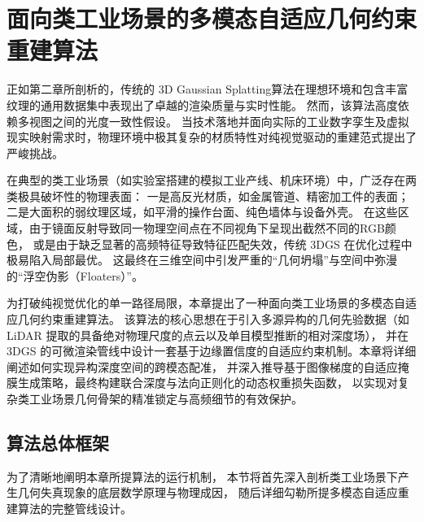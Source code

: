 
\chapter{面向类工业场景的多模态自适应几何约束重建算法}
\label{chap:method1}

正如第二章所剖析的，传统的 3D Gaussian Splatting算法在理想环境和包含丰富纹理的通用数据集中表现出了卓越的渲染质量与实时性能。
然而，该算法高度依赖多视图之间的光度一致性假设。
当技术落地并面向实际的工业数字孪生及虚拟现实映射需求时，物理环境中极其复杂的材质特性对纯视觉驱动的重建范式提出了严峻挑战。

在典型的类工业场景（如实验室搭建的模拟工业产线、机床环境）中，广泛存在两类极具破坏性的物理表面：
一是高反光材质，如金属管道、精密加工件的表面；
二是大面积的弱纹理区域，如平滑的操作台面、纯色墙体与设备外壳。
在这些区域，由于镜面反射导致同一物理空间点在不同视角下呈现出截然不同的RGB颜色，
或是由于缺乏显著的高频特征导致特征匹配失效，传统 3DGS 在优化过程中极易陷入局部最优。
这最终在三维空间中引发严重的“几何坍塌”与空间中弥漫的“浮空伪影（Floaters）”。

为打破纯视觉优化的单一路径局限，本章提出了一种面向类工业场景的多模态自适应几何约束重建算法。
该算法的核心思想在于引入多源异构的几何先验数据（如 LiDAR 提取的具备绝对物理尺度的点云以及单目模型推断的相对深度场），
并在 3DGS 的可微渲染管线中设计一套基于边缘置信度的自适应约束机制。本章将详细阐述如何实现异构深度空间的跨模态配准，
并深入推导基于图像梯度的自适应掩膜生成策略，最终构建联合深度与法向正则化的动态权重损失函数，
以实现对复杂类工业场景几何骨架的精准锁定与高频细节的有效保护。


\section{算法总体框架}
\label{sec:chap3_framework}

为了清晰地阐明本章所提算法的运行机制，
本节将首先深入剖析类工业场景下产生几何失真现象的底层数学原理与物理成因，
随后详细勾勒所提多模态自适应重建算法的完整管线设计。

